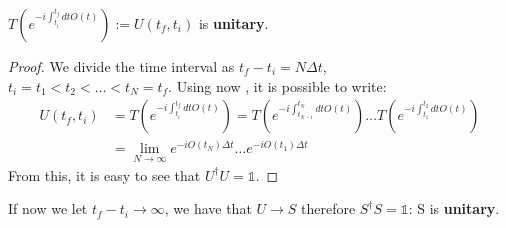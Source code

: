 \documentclass[../main.tex]{subfiles}
\begin{document}
\begin{proposition}
$T\left(e^{-i\int_{t_i}^{t_f}dtO(t)}\right):=U(t_f,t_i)$ is \textbf{unitary}.
\end{proposition}
\begin{proof}
We divide the time interval as $t_f-t_i=N\Delta t$,\\ $t_i=t_1<t_2<\dots<t_N=t_f$. Using now , it is possible to write:
\begin{align*}
U(t_f,t_i)&=T\left(e^{-i\int_{t_i}^{t_f}dtO(t)}\right)=T\left(e^{-i\int_{t_{N-1}}^{t_N}dtO(t)}\right)\dots T\left(e^{-i\int_{t_1}^{t_2}dtO(t)}\right)\\
&=\lim_{N\to\infty}e^{-iO(t_N)\Delta t}\dots e^{-iO(t_1)\Delta t}
\end{align*}
From this, it is easy to see that $U^\dagger U=\mathbb{1}$.
\end{proof}
If now we let $t_f-t_i\to\infty$, we have that $U\to S$ therefore $S^\dagger S=\mathbb{1}$: S is \textbf{unitary}.
\end{document}
